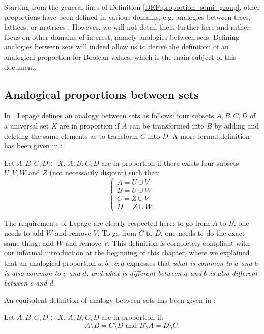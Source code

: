 Starting from the general lines of Definition \ref{DEF:proportion_semi_group},
other proportions have been defined in various domains, e.g. analogies
between trees, lattices, or matrices \cite{MicDel04, StrYvoREPORT05,
MicBayDelJAIR08}. However, we will not detail them further here and rather
focus on other domains of interest, namely analogies between sets. Defining
analogies between sets will indeed allow us to derive the definition of an
analogical proportion for Boolean values, which is the main subject of this
document.

\subsection{Analogical proportions between sets}

In \cite{Lep03}, Lepage defines an analogy between sets as follows: four subsets
$A, B, C, D$ of a universal set $X$ are in proportion if $A$ can be transformed
into $B$ by adding and deleting the same elements as to transform $C$ into $D$.
A more formal definition has been given in \cite{StrYvoREPORT05}:

\begin{definition}
  \label{DEF:analogy_set_facto}
  Let $A, B, C, D \subset X$. $A, B, C, D$ are in proportion if there exists
  four subsets $U, V, W$ and $Z$ (not necessarily disjoint) such that:
  $$
  \begin{cases}
    A = U \cup V\\
    B = U \cup W\\
    C = Z \cup V\\
    D = Z \cup W.
  \end{cases}
  $$
\end{definition}

The requirements of Lepage are clearly respected here: to go from $A$ to $B$,
one needs to add $W$ and remove $V$. To go from $C$ to $D$, one needs to do the
exact same thing: add $W$ and remove $V$. This definition is completely
compliant with our informal introduction at the beginning of this chapter,
where we explained that an analogical proportion $a:b::c:d$ expresses that
\textit{what is common to $a$ and $b$ is also common to $c$ and $d$, and what
is different between $a$ and $b$ is also different between $c$ and $d$}.


An equivalent definition of analogy between sets has been given in
\cite{MicPra09}:

\begin{definition}
  \label{DEF:analogy_set_miclet_henri}
  Let $A, B, C, D \subset X$. $A, B, C, D$ are in proportion if:
  $$
  A \setminus B = C \setminus D \text{ and } B \setminus A = D \setminus C.
  $$
\end{definition}

